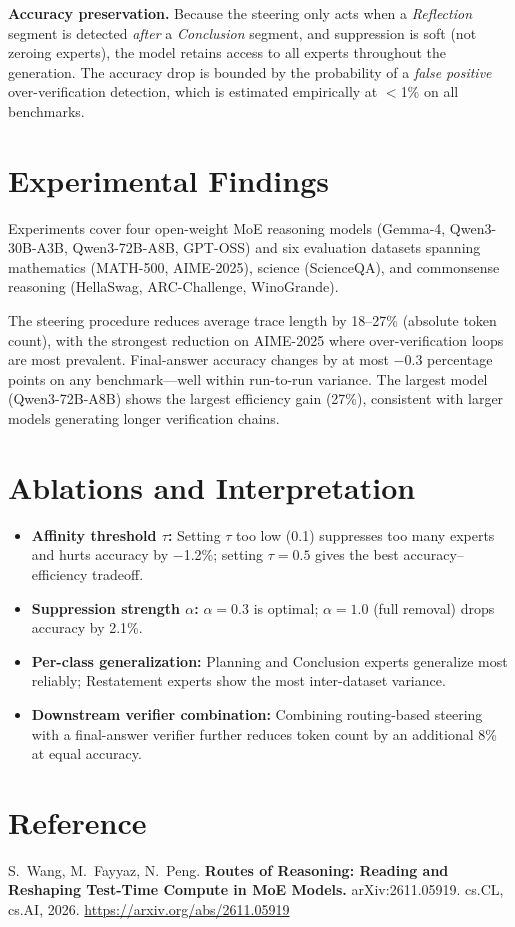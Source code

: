\documentclass[10pt,twocolumn]{article}
\begin{document}
\textbf{Accuracy preservation.}
Because the steering only acts when a \textit{Reflection} segment is detected \emph{after} a \textit{Conclusion} segment, and suppression is soft (not zeroing experts), the model retains access to all experts throughout the generation.
The accuracy drop is bounded by the probability of a \emph{false positive} over-verification detection, which is estimated empirically at $<$1\% on all benchmarks.

\section{Experimental Findings}

Experiments cover four open-weight MoE reasoning models (Gemma-4, Qwen3-30B-A3B, Qwen3-72B-A8B, GPT-OSS) and six evaluation datasets spanning mathematics (MATH-500, AIME-2025), science (ScienceQA), and commonsense reasoning (HellaSwag, ARC-Challenge, WinoGrande).

The steering procedure reduces average trace length by 18--27\% (absolute token count), with the strongest reduction on AIME-2025 where over-verification loops are most prevalent.
Final-answer accuracy changes by at most $-$0.3 percentage points on any benchmark---well within run-to-run variance.
The largest model (Qwen3-72B-A8B) shows the largest efficiency gain (27\%), consistent with larger models generating longer verification chains.

\section{Ablations and Interpretation}

\begin{itemize}[leftmargin=1em,itemsep=2pt]
  \item \textbf{Affinity threshold $\tau$:} Setting $\tau$ too low (0.1) suppresses too many experts and hurts accuracy by $-$1.2\%; setting $\tau=0.5$ gives the best accuracy--efficiency tradeoff.
  \item \textbf{Suppression strength $\alpha$:} $\alpha=0.3$ is optimal; $\alpha=1.0$ (full removal) drops accuracy by 2.1\%.
  \item \textbf{Per-class generalization:} Planning and Conclusion experts generalize most reliably; Restatement experts show the most inter-dataset variance.
  \item \textbf{Downstream verifier combination:} Combining routing-based steering with a final-answer verifier further reduces token count by an additional 8\% at equal accuracy.
\end{itemize}

\section*{Reference}
S.\ Wang, M.\ Fayyaz, N.\ Peng.
\textbf{Routes of Reasoning: Reading and Reshaping Test-Time Compute in MoE Models.}
arXiv:2611.05919. cs.CL, cs.AI, 2026.
\url{https://arxiv.org/abs/2611.05919}
\end{document}
